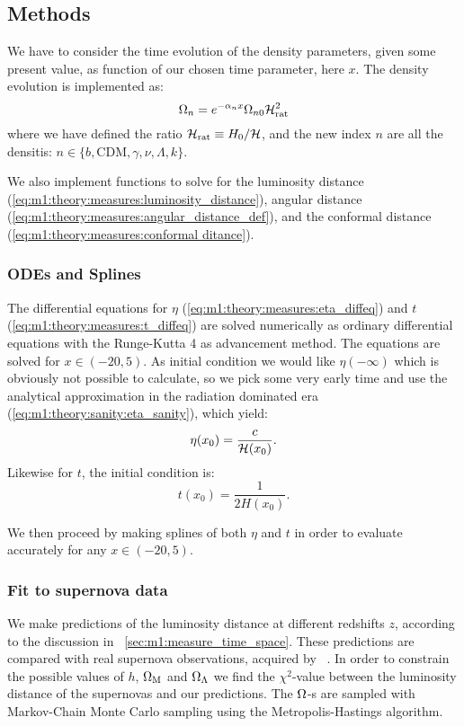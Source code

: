 \subsection{Methods}\label{sec:m1:methods}
    We have to consider the time evolution of the density parameters, given some present value, as function of our chosen time parameter, here $x$. The density evolution is implemented as:
    \begin{equation}\label{eq:m1:methods:initial:density_evolution}
        \Omega_n = e^{-\alpha_nx}\Omega_{n0}\mathcal{H}_\mathrm{rat}^2
    \end{equation}
    where we have defined the ratio $\mathcal{H}_\mathrm{rat} \equiv H_0/\mathcal{H}$, and the new index $n$ are all the densitis: $n\in\{b, \mathrm{CDM}, \gamma, \nu, \Lambda, k\}$.

    We also implement functions to solve for the luminosity distance (\cref{eq:m1:theory:measures:luminosity_distance}), angular distance (\cref{eq:m1:theory:measures:angular_distance_def}), and the conformal distance (\cref{eq:m1:theory:measures:conformal ditance}).


\subsubsection{ODEs and Splines}
    The differential equations for $\eta$ (\cref{eq:m1:theory:measures:eta_diffeq}) and $t$ (\cref{eq:m1:theory:measures:t_diffeq}) are solved numerically as ordinary differential equations with the Runge-Kutta 4 as advancement method. The equations are solved for $x\in(-20,5)$. As initial condition we would like $\eta(-\infty)$ which is obviously not possible to calculate, so we pick some very early time and use the analytical approximation in the radiation dominated era (\cref{eq:m1:theory:sanity:eta_sanity}), which yield:
    \begin{equation}\label{eq:m1:methods:odes:eta_initial}
        \eta(x_0) = \frac{c}{\mathcal{H}(x_0)}.
    \end{equation}
    Likewise for $t$, the initial condition is:
    \begin{equation}\label{eq:m1:methods:odes:t_initial}
        t(x_0) = \frac{1}{2H(x_0)}.
    \end{equation}
    
    We then proceed by making splines of both $\eta$ and $t$ in order to evaluate accurately for any $x\in(-20,5)$. 


\subsubsection{Fit to supernova data}\label{sec:m1:methods:fit}
    We make predictions of the luminosity distance at different redshifts $z$, according to the discussion in ~\cref{sec:m1:measure_time_space}. These predictions are compared with real supernova observations, acquired by ~\cite{Betoule_2014}. In order to constrain the possible values of $h$, $\Omega_\mathrm{M}$ and $\Omega_\Lambda$ we find the $\chi^2$-value between the luminosity distance of the supernovas and our predictions. The $\Omega$-s are sampled with Markov-Chain Monte Carlo sampling using the Metropolis-Hastings algorithm. 
    
